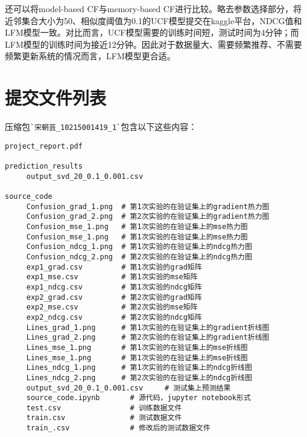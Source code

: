 \documentclass[12pt, a4paper]{ctexart}
\begin{document}
还可以将model-based CF与memory-based CF进行比较。略去参数选择部分，将近邻集合大小为50、相似度阈值为0.1的UCF模型提交在kaggle平台，NDCG值和LFM模型一致。对比而言，UCF模型需要的训练时间短，测试时间为4分钟；而LFM模型的训练时间为接近12分钟。因此对于数据量大、需要频繁推荐、不需要频繁更新系统的情况而言，LFM模型更合适。

\section{提交文件列表}

压缩包\verb|`宋朝芸_10215001419_1`|包含以下这些内容：

\begin{lstlisting}
project_report.pdf

prediction_results
     output_svd_20_0.1_0.001.csv

source_code
     Confusion_grad_1.png  # 第1次实验的在验证集上的gradient热力图
     Confusion_grad_2.png  # 第2次实验的在验证集上的gradient热力图
     Confusion_mse_1.png   # 第1次实验的在验证集上的mse热力图
     Confusion_mse_1.png   # 第1次实验的在验证集上的mse热力图
     Confusion_ndcg_1.png  # 第1次实验的在验证集上的ndcg热力图
     Confusion_ndcg_2.png  # 第2次实验的在验证集上的ndcg热力图
     exp1_grad.csv         # 第1次实验的grad矩阵
     exp1_mse.csv          # 第1次实验的mse矩阵
     exp1_ndcg.csv         # 第1次实验的ndcg矩阵
     exp2_grad.csv         # 第2次实验的grad矩阵
     exp2_mse.csv          # 第2次实验的mse矩阵
     exp2_ndcg.csv         # 第2次实验的ndcg矩阵
     Lines_grad_1.png      # 第1次实验的在验证集上的gradient折线图
     Lines_grad_2.png      # 第2次实验的在验证集上的gradient折线图
     Lines_mse_1.png       # 第1次实验的在验证集上的mse折线图
     Lines_mse_1.png       # 第1次实验的在验证集上的mse折线图
     Lines_ndcg_1.png      # 第1次实验的在验证集上的ndcg折线图
     Lines_ndcg_2.png      # 第2次实验的在验证集上的ndcg折线图
     output_svd_20_0.1_0.001.csv     # 测试集上预测结果
     source_code.ipynb       # 源代码，jupyter notebook形式
     test.csv                # 训练数据文件
     train.csv               # 测试数据文件
     train_.csv              # 修改后的测试数据文件
\end{lstlisting}




\newpage
\end{document}
